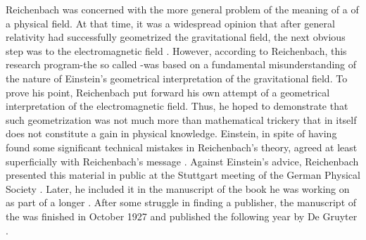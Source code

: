 \documentclass[final]{article}
\newcommand{\PRZL}{\citetitle{Reichenbach1928}\xspace}
\begin{document}
Reichenbach was concerned with the more general problem of the meaning of a  of a physical field. At that time, it was a widespread opinion that after general relativity had successfully geometrized the gravitational field, the next obvious step was to  the electromagnetic field . However, according to Reichenbach, this research program-the so called \uftp {}-was based on a fundamental misunderstanding of the nature of Einstein's geometrical interpretation of the gravitational field. To prove his point, Reichenbach put forward his own attempt of a geometrical interpretation of the electromagnetic field. Thus, he hoped to demonstrate that such geometrization was not much more than mathematical trickery that in itself does not constitute a gain in physical knowledge. Einstein, in spite of having found some significant technical mistakes in Reichenbach's theory, agreed at least superficially with Reichenbach's  message \citep{Lehmkuhl2014}. Against Einstein's advice, Reichenbach presented this material in public at the Stuttgart meeting of the German Physical Society \citep{Reichenbach1926d}. Later, he included it in the manuscript of the book he was working on as part of a longer \Ap. After some struggle in finding a publisher, the manuscript of the \PRZL was finished in October 1927 and published the following year by De Gruyter \citep[044-06-25]{HR}.
\end{document}
